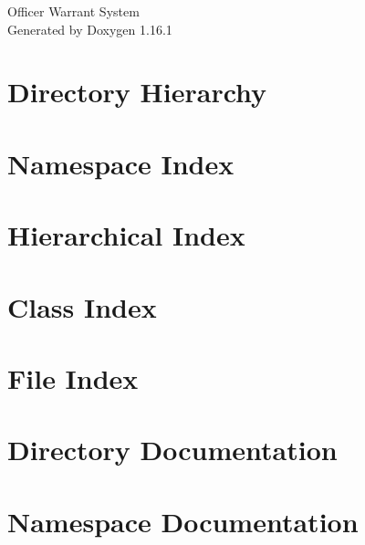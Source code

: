 \documentclass[twoside]{book}
\newcommand{\+}{\discretionary{\mbox{\scriptsize$\hookleftarrow$}}{}{}}
\newcommand{\clearemptydoublepage}{%
    \newpage{\pagestyle{empty}\cleardoublepage}%
  }
\begin{document}
  \raggedbottom
    \hypersetup{pageanchor=false,
                bookmarksnumbered=true,
                pdfencoding=unicode
               }
  \begin{titlepage}
  \vspace*{7cm}
  \begin{center}%
  {\Large Officer Warrant System}\\
  \vspace*{1cm}
  {\large Generated by Doxygen 1.16.1}\\
  \end{center}
  \end{titlepage}
  \clearemptydoublepage
  \tableofcontents
  \clearemptydoublepage
  \hypersetup{pageanchor=true}

\chapter{Directory Hierarchy}

\chapter{Namespace Index}

\chapter{Hierarchical Index}

\chapter{Class Index}

\chapter{File Index}

\chapter{Directory Documentation}




\chapter{Namespace Documentation}
















\end{document}
